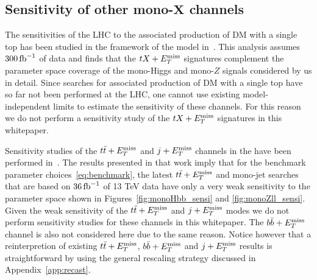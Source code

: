 \subsection[Sensitivity of other mono-$X$ channels]{Sensitivity of other mono-$\bm{X}$ channels}
\label{sec:sensi_others}

The sensitivities of the LHC to the associated production of DM with a single top has been  studied in the framework of the \hdma model in~\cite{Pani:2017qyd}. This analysis assumes $300 \, {\rm fb}^{-1}$ of data and finds that the $t X + E_T^\mathrm{miss}$ signatures complement the parameter space coverage of the mono-Higgs and  mono-$Z$ signals considered by us in detail.  Since searches for associated production of DM with a single top have so far not been performed at the LHC, one cannot use existing model-independent limits to estimate the sensitivity of these channels. For this reason we do not perform a sensitivity study of the $t X + E_T^\mathrm{miss}$ signatures in this whitepaper. 

Sensitivity studies of the $t \bar t + E_T^\mathrm{miss}$ and $j + E_T^\mathrm{miss}$ channels in the \hdma have been performed in~\cite{Bauer:2017ota}. The results presented in that work imply that for the benchmark parameter choices~\eqref{eq:benchmark}, the latest  $t \bar t + E_T^\mathrm{miss}$ and  mono-jet searches that are based on $36 \, {\rm fb}^{-1}$ of 13 TeV data have  only a very weak sensitivity to the parameter space shown in Figures~\ref{fig:monoHbb_sensi} and \ref{fig:monoZll_sensi}. Given the weak sensitivity of the $t \bar t + E_T^\mathrm{miss}$ and $j + E_T^\mathrm{miss}$ modes we do not perform sensitivity studies for these channels in this whitepaper. The $b \bar b + E_T^\mathrm{miss}$ channel is also not considered here due to the same reason. Notice however that a reinterpretion of existing $t \bar t + E_T^\mathrm{miss}$, $b \bar b + E_T^\mathrm{miss}$ and $j + E_T^\mathrm{miss}$ results is straightforward by using the general rescaling strategy discussed in Appendix~\ref{app:recast}. 










